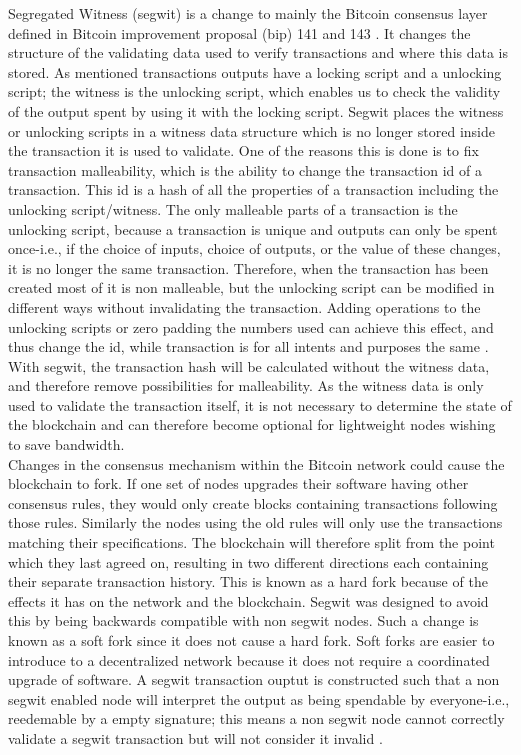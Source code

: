 Segregated Witness (segwit) is a change to mainly the Bitcoin consensus layer defined in Bitcoin improvement proposal (bip) 141 and 143 \cite{BIP141,BIP143}. It changes the structure of the validating data used to verify transactions and where this data is stored. As mentioned transactions outputs have a locking script and a unlocking script; the witness is the unlocking script, which enables us to check the validity of the output spent by using it with the locking script. Segwit places the witness or unlocking scripts in a witness data structure which is no longer stored inside the transaction it is used to validate. One of the reasons this is done is to fix transaction malleability, which is the ability to change the transaction id of a transaction. This id is a hash of all the properties of a transaction including the unlocking script/witness. The only malleable parts of a transaction is the unlocking script, because a transaction is unique and outputs can only be spent once-i.e., if the choice of inputs, choice of outputs, or the value of these changes, it is no longer the same transaction.
Therefore, when the transaction has been created most of it is non malleable, but the unlocking script can be modified in different ways without invalidating the transaction. Adding operations to the unlocking scripts or zero padding the numbers used can achieve this effect, and thus change the id, while transaction is for all intents and purposes the same \cite{BIP62}. With segwit, the transaction hash will be calculated without the witness data, and therefore remove possibilities for malleability. As the witness data is only used to validate the transaction itself, it is not necessary to determine the state of the blockchain and can therefore become optional for lightweight nodes wishing to save bandwidth. 
\\

Changes in the consensus mechanism within the Bitcoin network could cause the blockchain to fork. If one set of nodes upgrades their software having other consensus rules, they would only create blocks containing transactions following those rules. Similarly the nodes using the old rules will only use the transactions matching their specifications. The blockchain will therefore split from the point which they last agreed on, resulting in two different directions each containing their separate transaction history. This is known as a hard fork because of the effects it has on the network and the blockchain. Segwit was designed to avoid this by being backwards compatible with non segwit nodes. Such a change is known as a soft fork since it does not cause a hard fork. Soft forks are easier to introduce to a decentralized network because it does not require a coordinated upgrade of software. A segwit transaction ouptut is constructed such that a non segwit enabled node will interpret the output as being spendable by everyone-i.e., reedemable by a empty signature; this means a non segwit node cannot correctly validate a segwit transaction but will not consider it invalid \cite{antonopoulos2017mastering}. 
\\


